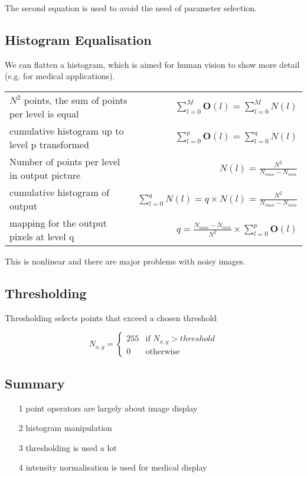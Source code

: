 The second equation is used to avoid the need of parameter selection.
\newpage
\subsection{Histogram Equalisation}
We can flatten a histogram, which is aimed for human vision to show more detail (e.g. for medical applications).

\begin{table}[ht!]
\centering
{%
\begin{tabular}{lr}
 $N^{2}$ points, the sum of points per level is equal & $\sum_{l=0}^{M}\mathbf{O}(l) = \sum_{l=0}^{M}N(l)$ \\[0.5cm]
 cumulative histogram up to level p transformed & $\sum_{l=0}^{p}\mathbf{O}(l) = \sum_{l=0}^{q}N(l)$  \\[0.5cm]
 Number of points per level in output picture & $N(l)=\frac{N^{2}}{N_{max}-N_{min}}$ \\[0.5cm]
 cumulative histogram of output & $\sum_{l=0}^{q}N(l) = q \times N(l)=\frac{N^{2}}{N_{max}-N_{min}}$  \\[0.5cm]
 mapping for the output pixels at level q & $q = \frac{N_{max} - N_{min}}{N^{2}}\times \sum_{l=0}^{p} \mathbf{O}(l)$ 
\end{tabular}%
}
\end{table}

This is nonlinear and there are major problems with noisy images.

\subsection{Thresholding}
Thresholding selects points that exceed a chosen threshold

\begin{equation}
    N_{x,y} = \begin{cases}
                255 & \text{if } N_{x,y}>threshold \\
                0 & \text{otherwise}
                \end{cases}
\end{equation}

\subsection{Summary}
\begin{itemize}
    \itemsep0em
    \item [1] point operators are largely about image display
    \item [2] histogram manipulation
    \item [3] thresholding is used a lot
    \item [4] intensity normalisation is used for medical display
\end{itemize}